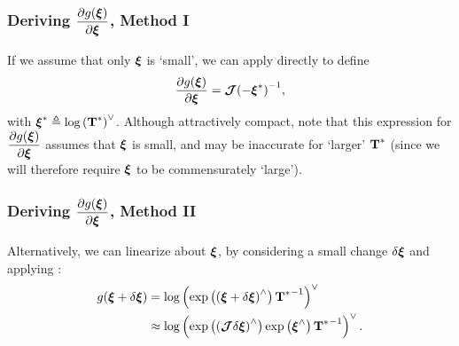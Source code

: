 \subsubsection{Deriving $\dfrac{\partial g({\boldsymbol{\mathbf{\xi}}})}{\partial \boldsymbol{\mathbf{\xi}}}$, Method I}
If we assume that only $\boldsymbol{\mathbf{\xi}}$ is `small', we can apply  directly to define
\begin{equation}
	\label{eq:logjacob_method1}
	\dfrac{\partial g({\boldsymbol{\mathbf{\xi}}})}{\partial \boldsymbol{\mathbf{\xi}}} = {\boldsymbol{\mathbf{\mathcal{J}}}(-\boldsymbol{\mathbf{\xi}}^*)}^{-1}, 
\end{equation}
with $	\boldsymbol{\mathbf{\xi}}^* \triangleq \mathrm{log}\left({\boldsymbol{\mathbf{T}}^*}\right)^{\vee}$. Although attractively compact, note that this expression for $\dfrac{\partial g({\boldsymbol{\mathbf{\xi}}})}{\partial \boldsymbol{\mathbf{\xi}}}$ assumes that $\boldsymbol{\mathbf{\xi}}$ is small, and may be inaccurate for `larger' $\boldsymbol{\mathbf{T}}^*$ (since we will therefore require $\boldsymbol{\mathbf{\xi}}$ to be commensurately `large').

\subsubsection{Deriving $\dfrac{\partial g({\boldsymbol{\mathbf{\xi}}})}{\partial \boldsymbol{\mathbf{\xi}}}$, Method II}

Alternatively, we can linearize  about $\boldsymbol{\mathbf{\xi}}$, by considering a small change $\delta \boldsymbol{\mathbf{\xi}}$ and applying :
\begin{align}
	g({\boldsymbol{\mathbf{\xi}} + \delta \boldsymbol{\mathbf{\xi}}}) &=  \mathrm{log}\left({\mathrm{exp}\left({( \boldsymbol{\mathbf{\xi}} + \delta \boldsymbol{\mathbf{\xi}})}^{\wedge}\right) {\boldsymbol{\mathbf{T}}^*}^{-1}}\right)^{\vee} \\
	&\approx \mathrm{log}\left({\mathrm{exp}\left({(\boldsymbol{\mathbf{\mathcal{J}}} \delta \boldsymbol{\mathbf{\xi}})}^{\wedge}\right) \mathrm{exp}\left({\boldsymbol{\mathbf{\xi}}}^{\wedge}\right) {\boldsymbol{\mathbf{T}}^*}^{-1}}\right)^{\vee}.
\end{align}


